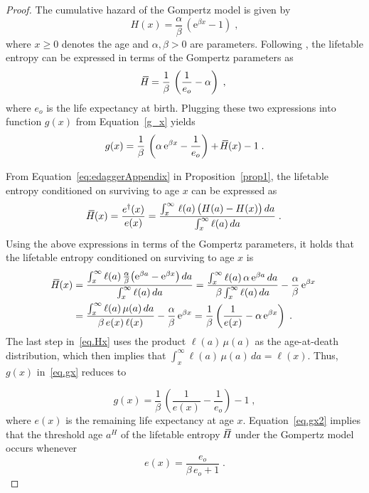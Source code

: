 \documentclass[a4paper,twoside, openright, 12pt, leqno]{article}
\newcommand*\xbar[1]{%
   \hbox{%
     \vbox{%
       \hrule height 0.5pt %
       \kern0.3ex%
       \hbox{%
         \kern-0.28em%
         \ensuremath{#1}%
         \kern-0.05em%
       }%
     }%
   }%
}
\begin{document}
\begin{proof}
The cumulative hazard of the Gompertz model is given by 
$$
H(x)=\frac{\alpha}{\beta}\,\left(\mathrm{e}^{\beta x} - 1 \right)\;,
$$
%
where $x\geq0$ denotes the age and $\alpha,\beta>0$ are parameters. Following \cite{wrycza2014entropy}, the lifetable entropy can be expressed in terms of the Gompertz parameters as
$$
\xbar{H}=\frac{1}{\beta}\,\left(\frac{1}{e_o}-\alpha\right)\;,
$$
where $e_o$ is the life expectancy at birth. Plugging these two expressions into function $g(x)$ from Equation~\eqref{g_x} yields
%
\begin{equation}
g(x) = \frac{1}{\beta}\,\left(\alpha\,\mathrm{e}^{\beta x} - \frac{1}{e_o} \right)+\,\xbar{H}(x)-1\;.
\label{eq.gx}
\end{equation}

From Equation~\eqref{eq:edaggerAppendix} in Proposition~\ref{prop1}, the lifetable entropy conditioned on surviving to age $x$ can be expressed as
$$
\xbar{H}(x)=\frac{e^\dagger(x)}{e(x)}=\frac{\int_x^\infty\,\ell(a)\,\big(H(a)-H(x)\big)\,da}{\int_x^\infty\ell(a)\,da}\;.
$$
Using the above expressions in terms of the Gompertz parameters, it holds that the lifetable entropy conditioned on surviving to age $x$ is
%
\begin{equation}
  \begin{split}
	\xbar{H}(x)
        & = \frac{\int_x^\infty \ell(a)\,\frac{\alpha}{\beta}\big(\mathrm{e}^{\beta a}-\mathrm{e}^{\beta x}\big)\,da}{\int_x^\infty\ell(a)\,da}=\frac{\int_x^\infty \ell(a)\,\alpha\,\mathrm{e}^{\beta a}\,da}{\beta\int_x^\infty\ell(a)\,da} - \frac{\alpha}{\beta}\,\mathrm{e}^{\beta x} 				\\
        & = \frac{\int_x^\infty\ell(a)\,\mu(a)\,da}{\beta\,e(x)\,\ell(x)} - \frac{\alpha}{\beta}\,\mathrm{e}^{\beta x}=\frac{1}{\beta}\left(\frac{1}{e(x)}-\alpha\,\mathrm{e}^{\beta x}\right)\;.
  \end{split}
  \label{eq.Hx}
\end{equation}
%
The last step in~\eqref{eq.Hx} uses the product $\ell(a)\,\mu(a)$ as the age-at-death distribution, which then implies that $\int_x^\infty \ell(a)\,\mu(a)\,da=\ell(x)$. Thus, $g(x)$ in~\eqref{eq.gx} reduces to

\begin{equation}
g(x) = \frac{1}{\beta}\,\left(\frac{1}{e(x)}-\frac{1}{e_o}\right)-1\;,
\label{eq.gx2}
\end{equation}
%
where $e(x)$ is the remaining life expectancy at age $x$. Equation~\eqref{eq.gx2} implies that the threshold age $a^H$ of the lifetable entropy $\,\xbar{H}$ under the Gompertz model occurs whenever
%
\begin{equation*}
  e(x) = \frac{e_o}{\beta\,e_o+1}\;.
  \label{eq.threshold}
\end{equation*}


\end{proof}
\end{document}
